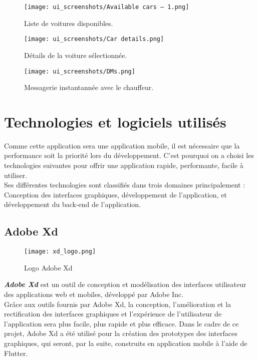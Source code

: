 \clearpage
\begin{multicols}{2}
    \begin{figure}[H]
        \centering
        \texttt{[image: ui\_screenshots/Available cars – 1.png]}
        \vspace{1cm}
        \caption{\centering Liste de voitures disponibles.}
        \label{fig:available_cars}
    \end{figure}
    \begin{figure}[H]
        \centering
        \texttt{[image: ui\_screenshots/Car details.png]}
        \vspace{1cm}
        \caption{\centering Détails de la voiture sélectionnée.}
        \label{fig:car_details}
    \end{figure}
\end{multicols}
\begin{figure}[H]
    \centering
    \texttt{[image: ui\_screenshots/DMs.png]}
    \vspace{.5cm}
    \caption{\centering Messagerie instantannée avec le chauffeur.}
    \label{fig:dms}
\end{figure}

\section{Technologies et logiciels utilisés}
Comme cette application sera une application mobile, il est nécessaire que la performance soit la priorité lors du développement. C'est pourquoi on a choisi les technologies suivantes pour offrir une application rapide, performante, facile à utiliser.\\
\noindent Ses différentes technologies sont classifiés dans trois domaines principalement : Conception des interfaces graphiques, développement de l'application, et développement du back-end de l'application.\\
\subsection{Adobe Xd}
\vspace{1cm}
\begin{figure}[H]
    \centering
    \texttt{[image: xd\_logo.png]}
    \vspace{.5cm}
    \caption{Logo Adobe Xd}
    \label{fig:xd_logo}
\end{figure}
\textit{\textbf{Adobe Xd}} est un outil de conception et modélisation des interfaces utilisateur des applications web et mobiles, développé par Adobe Inc.\\
\noindent Grâce aux outils fournis par Adobe Xd, la conception, l'amélioration et la rectification des interfaces graphiques et l'expérience de l'utilisateur de l'application sera plus facile, plus rapide et plus efficace.
\noindent Dans le cadre de ce projet, Adobe Xd a été utilisé pour la création des prototypes des interfaces graphiques, qui seront, par la suite, construits en application mobile à l'aide de Flutter.
